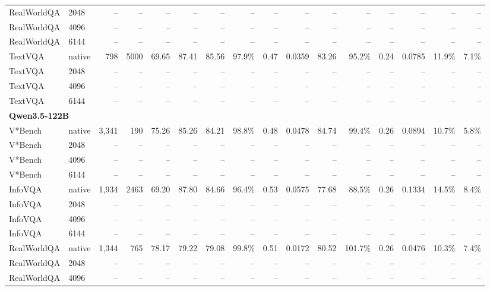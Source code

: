 \begin{table}[t]
{\begin{tabular}{llrrrrrrrrrrrrrr}
RealWorldQA & 2048 & -- & -- & -- & -- & -- & -- & -- & -- & -- & -- & -- & -- & -- & -- \\
RealWorldQA & 4096 & -- & -- & -- & -- & -- & -- & -- & -- & -- & -- & -- & -- & -- & -- \\
RealWorldQA & 6144 & -- & -- & -- & -- & -- & -- & -- & -- & -- & -- & -- & -- & -- & -- \\
TextVQA & native & 798 & 5000 & 69.65 & 87.41 & 85.56 & 97.9\% & 0.47 & 0.0359 & 83.26 & 95.2\% & 0.24 & 0.0785 & 11.9\% & 7.1\% \\
TextVQA & 2048 & -- & -- & -- & -- & -- & -- & -- & -- & -- & -- & -- & -- & -- & -- \\
TextVQA & 4096 & -- & -- & -- & -- & -- & -- & -- & -- & -- & -- & -- & -- & -- & -- \\
TextVQA & 6144 & -- & -- & -- & -- & -- & -- & -- & -- & -- & -- & -- & -- & -- & -- \\
\midrule
\multicolumn{10}{l}{\textbf{Qwen3.5-122B}} \\
V*Bench & native & 3,341 & 190 & 75.26 & 85.26 & 84.21 & 98.8\% & 0.48 & 0.0478 & 84.74 & 99.4\% & 0.26 & 0.0894 & 10.7\% & 5.8\% \\
V*Bench & 2048 & -- & -- & -- & -- & -- & -- & -- & -- & -- & -- & -- & -- & -- & -- \\
V*Bench & 4096 & -- & -- & -- & -- & -- & -- & -- & -- & -- & -- & -- & -- & -- & -- \\
V*Bench & 6144 & -- & -- & -- & -- & -- & -- & -- & -- & -- & -- & -- & -- & -- & -- \\
InfoVQA & native & 1,934 & 2463 & 69.20 & 87.80 & 84.66 & 96.4\% & 0.53 & 0.0575 & 77.68 & 88.5\% & 0.26 & 0.1334 & 14.5\% & 8.4\% \\
InfoVQA & 2048 & -- & -- & -- & -- & -- & -- & -- & -- & -- & -- & -- & -- & -- & -- \\
InfoVQA & 4096 & -- & -- & -- & -- & -- & -- & -- & -- & -- & -- & -- & -- & -- & -- \\
InfoVQA & 6144 & -- & -- & -- & -- & -- & -- & -- & -- & -- & -- & -- & -- & -- & -- \\
RealWorldQA & native & 1,344 & 765 & 78.17 & 79.22 & 79.08 & 99.8\% & 0.51 & 0.0172 & 80.52 & 101.7\% & 0.26 & 0.0476 & 10.3\% & 7.4\% \\
RealWorldQA & 2048 & -- & -- & -- & -- & -- & -- & -- & -- & -- & -- & -- & -- & -- & -- \\
RealWorldQA & 4096 & -- & -- & -- & -- & -- & -- & -- & -- & -- & -- & -- & -- & -- & -- \\

\end{tabular}}
\end{table}
